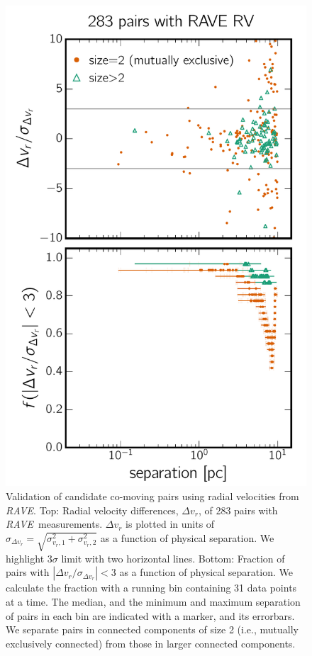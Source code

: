 \documentclass[manuscript, letterpaper]{aastex6}
\newcommand{\project}[1]{\textsl{#1}}
\newcommand{\acronym}[1]{{\small{#1}}}
\newcommand{\rave}{\project{\acronym{RAVE}}}
\begin{document}
\begin{figure}[htbp]
  \begin{center}
    \includegraphics[width=.5\linewidth]{figures/raverv.pdf}
  \end{center}
  \caption{%
    Validation of candidate co-moving pairs using radial velocities from \rave.
    Top: Radial velocity differences, $\Delta v_r$, of 283 pairs with \rave\ measurements.
    $\Delta v_r$ is plotted in units of $\sigma_{\Delta v_r} = \sqrt{\sigma_{v_r,1}^2 + \sigma_{v_r,2}^2}$
    as a function of physical separation.
    We highlight $3\sigma$ limit with two horizontal lines.
    Bottom: Fraction of pairs with $|\Delta v_r/\sigma_{\Delta v_r}| <3$
    as a function of physical separation. We calculate the fraction with a running
    bin containing 31 data points at a time.
    The median, and the minimum and maximum separation of pairs in each bin are
    indicated with a marker, and its errorbars.
    We separate pairs in connected components of size 2 (i.e., mutually exclusively connected)
    from those in larger connected components.
    \label{fig:raverv}}
\end{figure}
\end{document}
